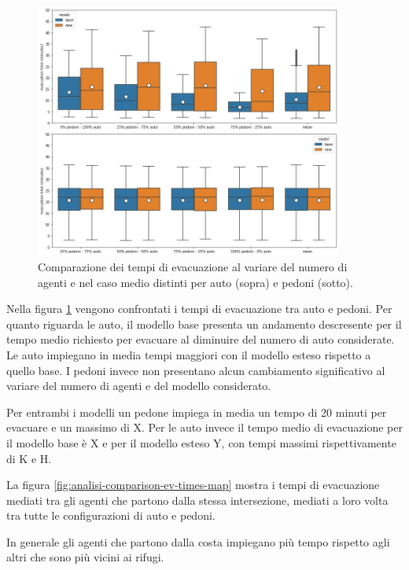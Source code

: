 \begin{figure}[ht]
    \centering
    \includegraphics[width=0.9\textwidth]{images/analisi/comparison-evtimes2.png}
    \caption{
        Comparazione dei tempi di evacuazione al variare del numero di agenti e nel caso medio distinti per auto (sopra) e pedoni (sotto).
    }
    \label{fig:analisi-comparison-evtimes2}
\end{figure}

Nella figura \ref{fig:analisi-comparison-evtimes2} vengono confrontati i tempi di evacuazione tra auto e pedoni.
Per quanto riguarda le auto, il modello base presenta un andamento descresente per il tempo medio richiesto per evacuare al diminuire del numero di auto considerate.
Le auto impiegano in media tempi maggiori con il modello esteso rispetto a quello base.
%
I pedoni invece non presentano alcun cambiamento significativo al variare del numero di agenti e del modello considerato. 

Per entrambi i modelli un pedone impiega in media un tempo di 20 minuti per evacuare e un massimo di X.
Per le auto invece il tempo medio di evacuazione per il modello base è X e per il modello esteso Y, 
con tempi massimi rispettivamente di K e H.

La figura \ref{fig:analisi-comparison-ev-times-map} mostra i tempi di evacuazione mediati tra gli agenti che partono dalla stessa intersezione,
mediati a loro volta tra tutte le configurazioni di auto e pedoni.

In generale gli agenti che partono dalla costa impiegano più tempo rispetto agli altri che sono più vicini ai rifugi.

